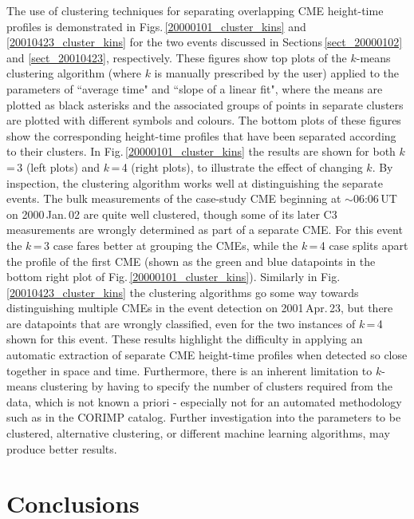 \documentclass[referee,a4paper,12pt,traditabstract]{swsc}
\begin{document}
The use of clustering techniques for separating overlapping CME height-time profiles is demonstrated in Figs.\,\ref{20000101_cluster_kins} and \ref{20010423_cluster_kins} for the two events discussed in Sections\,\ref{sect_20000102} and \ref{sect_20010423}, respectively. These figures show top plots of the $k$-means clustering algorithm (where $k$ is manually prescribed by the user) applied to the parameters of ``average time" and ``slope of a linear fit", where the means are plotted as black asterisks and the associated groups of points in separate clusters are plotted with different symbols and colours. The bottom plots of these figures show the corresponding height-time profiles that have been separated according to their clusters. In Fig.\,\ref{20000101_cluster_kins} the results are shown for both $k$\,=\,3 (left plots) and $k$\,=\,4 (right plots), to illustrate the effect of changing $k$. By inspection, the clustering algorithm works well at distinguishing the separate events. The bulk measurements of the case-study CME beginning at $\sim$06:06\,UT on 2000\,Jan.\,02 are quite well clustered, though some of its later C3 measurements are wrongly determined as part of a separate CME. For this event the $k$\,=\,3 case fares better at grouping the CMEs, while the $k$\,=\,4 case splits apart the profile of the first CME (shown as the green and blue datapoints in the bottom right plot of Fig.\,\ref{20000101_cluster_kins}). Similarly in Fig.\,\ref{20010423_cluster_kins} the clustering algorithms go some way towards distinguishing multiple CMEs in the event detection on 2001\,Apr.\,23, but there are datapoints that are wrongly classified, even for the two instances of $k$\,=\,4 shown for this event. These results highlight the difficulty in applying an automatic extraction of separate CME height-time profiles when detected so close together in space and time. Furthermore, there is an inherent limitation to $k$-means clustering by having to specify the number of clusters required from the data, which is not known a priori - especially not for an automated methodology such as in the CORIMP catalog. Further investigation into the parameters to be clustered, alternative clustering, or different machine learning algorithms, may produce better results.


\section{Conclusions}
\label{sect_conclusions}
\end{document}
